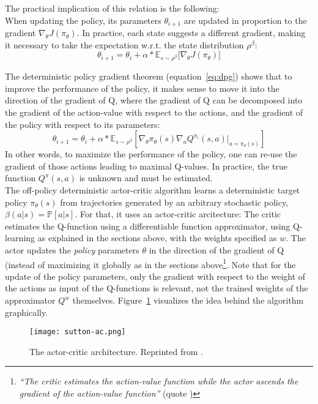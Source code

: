 \noindent The practical implication of this relation is the following:\\
\noindent When updating the policy, its parameters $\theta_{i+1}$ are updated in proportion to the gradient $\nabla_{\theta}J(\pi_\theta)$. In practice, each state suggests a different gradient, making it necessary to take the expectation w.r.t. the state distribution $\rho^\beta$: 
\begin{equation*}
	\theta_{i+1} = \theta_i + \alpha * \mathds{E}_{s\sim\rho^\beta} \big[ \nabla_{\theta}J(\pi_\theta) \big]
\end{equation*}

The deterministic policy gradient theorem (equation~\ref{eq:dpg}) shows that to improve the performance of the policy, it makes sense to move it into the direction of the gradient of Q, where the gradient of Q can be decomposed into the gradient of the action-value with respect to the actions, and the gradient of the policy with respect to its parameters:
\begin{equation*}
	\theta_{i+1} = \theta_i + \alpha * \mathds{E}_{s \sim \rho^\beta} \left[ \nabla_\theta \pi_{\theta}(s) \nabla_a Q^{\pi_i}(s,a) \big|_{a=\pi_\theta(s)} \right]
\end{equation*} 
In other words, to maximize the performance of the policy, one can re-use the gradient of those actions leading to maximal Q-values. In practice, the true function $Q^\pi(s,a)$ is unknown and must be estimated.\\

\noindent The off-policy deterministic actor-critic algorithm learns a deterministic target policy $\pi_\theta(s)$ from trajectories generated by an arbitrary stochastic policy, $\beta(a|s) = \mathds{P}[a|s]$. For that, it uses an actor-critic arcitecture: The critic estimates the Q-function using a differentiable function approximator, using Q-learning as explained in the sections above, with the weights specified as $w$. The actor updates the \textit{policy} parameters $\theta$ in the direction of the gradient of Q (instead of maximizing it globally as in the sections above\footnote{\textit{``The critic estimates the action-value function while the actor ascends the gradient of the action-value function''} (quote \cite{silver_deterministic_2014})}. Note that for the update of the policy parameters, only the gradient with respect to the weight of the actions as input of the Q-functions is relevant, not the trained weights of the approximator $Q^w$ themselves. Figure~\ref{fig:actorcritic} visualizes the idea behind the algorithm graphically.
\begin{figure}[h]
	\texttt{[image: sutton-ac.png]}
	\centering
	\caption[The actor-critic architecture]{The actor-critic architecture. Reprinted from \cite{richard_s._sutton_reinforcement_1998}.}
	\label{fig:actorcritic}
\end{figure}

